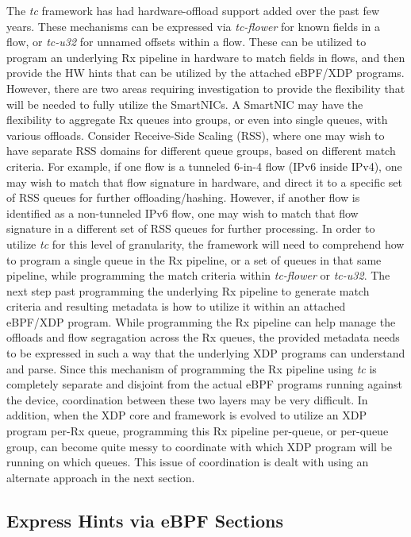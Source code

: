 \documentclass[letterpaper]{article}
\begin{document}
The \textit{tc} framework has had hardware-offload support added over the past few years. These mechanisms can be expressed via \textit{tc-flower} for known fields in a flow, or \textit{tc-u32} for unnamed offsets within a flow. These can be utilized to program an underlying Rx pipeline in hardware to match fields in flows, and then provide the HW hints that can be utilized by the attached eBPF/XDP programs. However, there are two areas requiring investigation to provide the flexibility that will be needed to fully utilize the SmartNICs.
\newline
\indent A SmartNIC may have the flexibility to aggregate Rx queues into groups, or even into single queues, with various offloads. Consider Receive-Side Scaling (RSS), where one may wish to have separate RSS domains for different queue groups, based on different match criteria. For example, if one flow is a tunneled 6-in-4 flow (IPv6 inside IPv4), one may wish to match that flow signature in hardware, and direct it to a specific set of RSS queues for further offloading/hashing. However, if another flow is identified as a non-tunneled IPv6 flow, one may wish to match that flow signature in a different set of RSS queues for further processing. In order to utilize \textit{tc} for this level of granularity, the framework will need to comprehend how to program a single queue in the Rx pipeline, or a set of queues in that same pipeline, while programming the match criteria within \textit{tc-flower} or \textit{tc-u32}.
\newline
\indent The next step past programming the underlying Rx pipeline to generate match criteria and resulting metadata is how to utilize it within an attached eBPF/XDP program. While programming the Rx pipeline can help manage the offloads and flow segragation across the Rx queues, the provided metadata needs to be expressed in such a way that the underlying XDP programs can understand and parse. Since this mechanism of programming the Rx pipeline using \textit{tc} is completely separate and disjoint from the actual eBPF programs running against the device, coordination between these two layers may be very difficult. In addition, when the XDP core and framework is evolved to utilize an XDP program per-Rx queue, programming this Rx pipeline per-queue, or per-queue group, can become quite messy to coordinate with which XDP program will be running on which queues. This issue of coordination is dealt with using an alternate approach in the next section.

\subsection{Express Hints via eBPF Sections}
\end{document}
